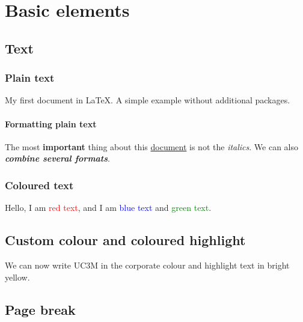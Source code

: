 \chapter{Basic elements}
\label{ch:basics} %



\section{Text}

\subsection{Plain text}

My first document in \LaTeX. A simple example without additional packages.


\subsubsection{Formatting plain text}

The most \textbf{important} thing about this \underline{document}
is not the \textit{italics}.
We can also \textbf{\textit{combine several formats}}.


\subsection{Coloured text}

Hello, I am \textcolor{red}{red text}, and I am \textcolor{blue}{blue text}
and \textcolor{green}{green text}.


\section{Custom colour and coloured highlight}

We can now write \textcolor{azulUC3M}{UC3M} in the corporate colour and
\colorbox{highlightYellow}{highlight text} in bright yellow.


\section{Page break}

